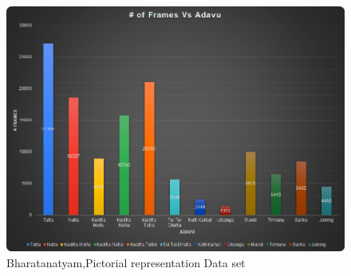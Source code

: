 \begin{figure}[hbt!]
\centering
  \includegraphics[scale= 0.8]{./Pictures/DataSet_Introduction.png}
  \caption{Bharatanatyam,Pictorial representation Data set}
  \label{fig:Ch03F002}
\end{figure}


